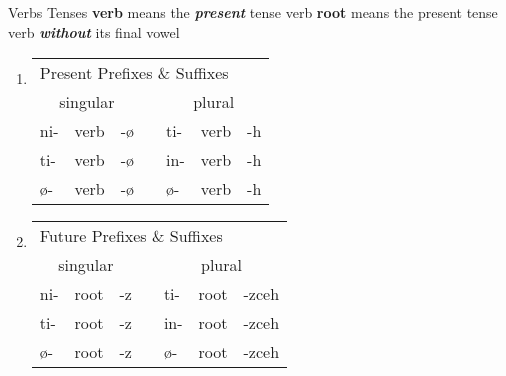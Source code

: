\documentclass[12pt]{beamer}
\newcommand{\nah}[1]{\textcolor{nahgrn}{#1}}
\newcommand{\trs}[1]{\textcolor{nahblu}{#1}}
\begin{document}
\begin{frame}
\begin{columns}[t]
		\begin{column}{.26\linewidth}
			\begin{block}{Verbs Tenses}
				\textbf{verb} means the \textbf{\textit{present}} tense verb \newline
				\textbf{root} means the present tense verb \textbf{\textit{without}} its final vowel \newline
				\begin{enumerate}
					\item \begin{tabular}[t]{lllllll}
						\multicolumn{7}{l}{Present \nah{Prefixes} \& \trs{Suffixes}}              \\
						\multicolumn{3}{c}{singular}    & \vline & \multicolumn{3}{c}{plural}     \\
						\cline{1-7}
						\nah{ni-}   & verb & \trs{-ø}   & \vline & \nah{ti-}   & verb & \trs{-h}  \\
						\nah{ti-}   & verb & \trs{-ø}   & \vline & \nah{in-}   & verb & \trs{-h}  \\
						\nah{ø-}    & verb & \trs{-ø}   & \vline & \nah{ø-}    & verb & \trs{-h}  \\
					\end{tabular}%
					\item \begin{tabular}[t]{lllllll}
						\multicolumn{7}{l}{Future \nah{Prefixes} \& \trs{Suffixes}}       	         \\
						\multicolumn{3}{c}{singular}    & \vline & \multicolumn{3}{c}{plural}        \\
						\cline{1-7}
						\nah{ni-}   & root & \trs{-z}   & \vline & \nah{ti-}   & root & \trs{-zceh}  \\
						\nah{ti-}   & root & \trs{-z}   & \vline & \nah{in-}   & root & \trs{-zceh}  \\
						\nah{ø-}    & root & \trs{-z}   & \vline & \nah{ø-}    & root & \trs{-zceh}  \\
					\end{tabular}%
				
				\end{enumerate}
			\end{block}
			

\end{column}
\end{columns}
\end{frame}
\end{document}
